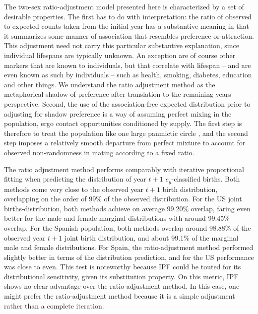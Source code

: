\FloatBarrier

The two-sex ratio-adjustment model presented here is
characterized by a set of desirable properties. The first has to do with
interpretation: the ratio of observed to expected counts taken from the initial
year has a substantive meaning in that it summarizes 
some manner of association that resembles preference or attraction. This adjustment need not carry this
particular substantive explanation, since individual lifespans are typically unknown. An exception are of course other markers that are known to individuals, but that correlate with lifespan -- and
 are even known as such by individuals -- such as health, smoking, diabetes, education 
 and other things. We understand the ratio adjustment method as the metaphorical
 shadow of preference after translation to the remaining years perspective. Second, the use of the
association-free expected distribution prior to adjusting for shadow preference
is a way of assuming perfect mixing in the population, ergo contact
opportunities conditioned by supply. The first step is therefore to treat the
population like one large panmictic circle \citep[in the
sense of][]{henry1972nuptiality}, and the second step imposes a relatively
smooth departure from perfect mixture to account for observed non-randomness in
mating according to a fixed ratio.

The ratio adjustment method performs comparably with iterative proportional
fitting when predicting the distribution of year $t+1$ $e_y$-classified births. 
Both methods come very close to the observed year $t+1$ birth distribution,
overlapping on the order of 99\% of the observed distribution. For the US joint
births-distribution, both methods achieve on average 99.20\% overlap, faring
even better for the male and female marginal distributions with around 99.45\%
overlap. For the Spanish population, both methods overlap around 98.88\% of
the observed year $t+1$ joint birth distribution, and about 99.1\% of the marginal male and
female distributions. For Spain, the ratio-adjustment method performed slightly
better in terms of the distribution prediction, and for the US performance was
close to even. This test is noteworthy because IPF could be touted for its
distributional sensitivity, given its substitution property. On this
metric, IPF shows no clear advantage over the ratio-adjustment method. In this
case, one might prefer the ratio-adjustment method because it is a simple
adjustment rather than a complete iteration. 

